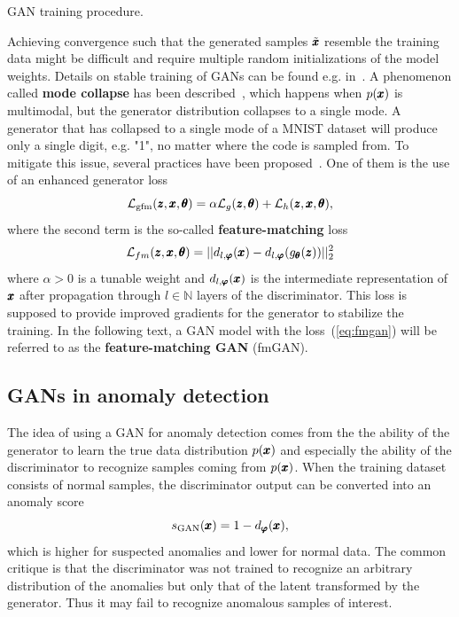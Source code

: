 \begin{algorithm}

\caption{GAN training procedure.}
\label{alg:gan_train}
\end{algorithm}

Achieving convergence such that the generated samples $\tilde{\pmb{{x}}}$ resemble the training data might be difficult and require multiple random initializations of the model weights. Details on stable training of GANs can be found e.g. in~\cite{gui2021review}. A phenomenon called \textbf{mode collapse} has been described~\cite{goodfellow2016nips}, which happens when $p(\pmb{{x}})$ is multimodal, but the generator distribution collapses to a single mode. A generator that has collapsed to a single mode of a MNIST dataset will produce only a single digit, e.g. "1", no matter where the code is sampled from. To mitigate this issue, several practices have been proposed~\cite{salimans2016fmgan,hong2019generative}. One of them is the use of an enhanced generator loss
\begin{equation} \label{eq:fmgan}
\mathcal{L}_{\text{gfm}}(\pmb{{z}},\pmb{{x}},\pmb{{\theta}})=\alpha\mathcal{L}_{g}(\pmb{{z}},\pmb{{\theta}})+\mathcal{L}_{h}(\pmb{{z}},\pmb{{x}},\pmb{{\theta}}),
\end{equation}
where the second term is the so-called \textbf{feature-matching} loss
\begin{equation} \label{eq:fm_loss}
\mathcal{L}_{fm}(\pmb{{z}},\pmb{{x}},\pmb{{\theta}}) = ||d_{l,\pmb{{\varphi}}}(\pmb{{x}})-d_{l,\pmb{{\varphi}}}(g_{\pmb{{\theta}}}(\pmb{{z}}))||_{2}^{2}
\end{equation}
where $\alpha > 0$ is a tunable weight and $d_{l,\pmb{{\varphi}}}(\pmb{{x}})$ is the intermediate representation of $\pmb{{x}}$ after propagation through $l \in \mathbb{N}$ layers of the discriminator. This loss is supposed to provide improved gradients for the generator to stabilize the training. In the following text, a GAN model with the loss~(\ref{eq:fmgan}) will be referred to as the \textbf{feature-matching GAN} (fmGAN).

\subsection{GANs in anomaly detection}
The idea of using a GAN for anomaly detection comes from the the ability of the generator to learn the true data distribution $p(\pmb{{x}})$ and especially the ability of the discriminator to recognize samples coming from $p(\pmb{{x}})$. When the training dataset consists of normal samples, the discriminator output can be converted into an anomaly score
\begin{equation} \label{eq:disc_score}
     s_{\text{GAN}}(\pmb{{x}}) = 1 - d_{\pmb{{\varphi}}}(\pmb{{x}}),
\end{equation}
which is higher for suspected anomalies and lower for normal data. The common critique is that the discriminator was not trained to recognize an arbitrary distribution of the anomalies but only that of the latent transformed by the generator. Thus it may fail to recognize anomalous samples of interest. 

